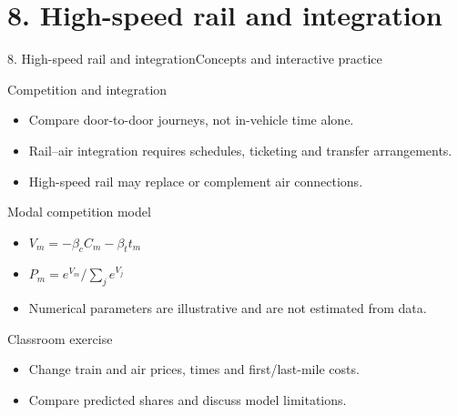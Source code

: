 \documentclass[aspectratio=169,11pt]{beamer}
\begin{document}
\section{8. High-speed rail and integration}
\begin{frame}{8. High-speed rail and integration}\centering\Large Concepts and interactive practice\end{frame}
\begin{frame}{Competition and integration}\begin{itemize}
\item Compare door-to-door journeys, not in-vehicle time alone.
\item Rail--air integration requires schedules, ticketing and transfer arrangements.
\item High-speed rail may replace or complement air connections.
\end{itemize}\end{frame}
\begin{frame}{Modal competition model}\begin{itemize}
\item $V_m=-\beta_c C_m-\beta_t t_m$
\item $P_m=e^{V_m}/\sum_j e^{V_j}$
\item Numerical parameters are illustrative and are not estimated from data.
\end{itemize}\end{frame}
\begin{frame}{Classroom exercise}\begin{itemize}
\item Change train and air prices, times and first/last-mile costs.
\item Compare predicted shares and discuss model limitations.
\end{itemize}\end{frame}
\end{document}
